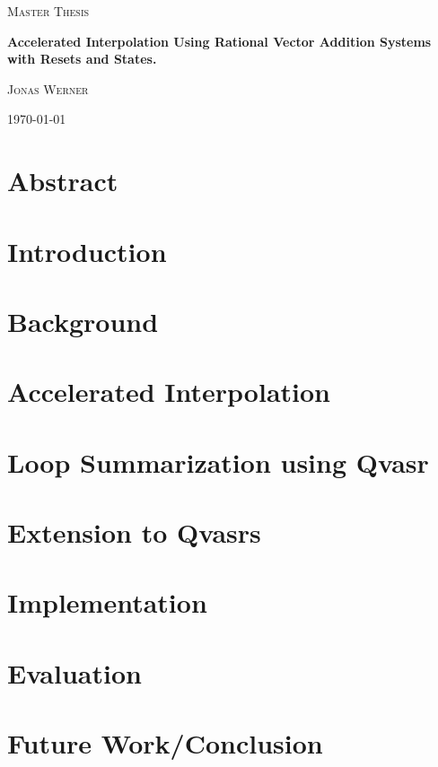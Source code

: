 \documentclass[11pt]{article}
\begin{document}
\newcommand{\HorizontalLine}{\rule{\linewidth}{0.3mm}}


\begin{center}
	{\scshape\Large Master Thesis \par}
	\vspace{1.5cm}
	{\huge\bfseries Accelerated Interpolation Using Rational Vector Addition Systems with Resets and States. \par}

	\vspace{1cm}
	{\large \scshape Jonas Werner\par}
	\vspace{0.5cm}
	{\today \vspace{2cm}}
\end{center}
\section*{Abstract}

\section*{Introduction}

\section*{Background}


\section*{Accelerated Interpolation}


\section*{Loop Summarization using Qvasr}


\section*{Extension to Qvasrs}


\section*{Implementation}


\section*{Evaluation}


\section*{Future Work/Conclusion}



\pagebreak
{}


\end{document}

